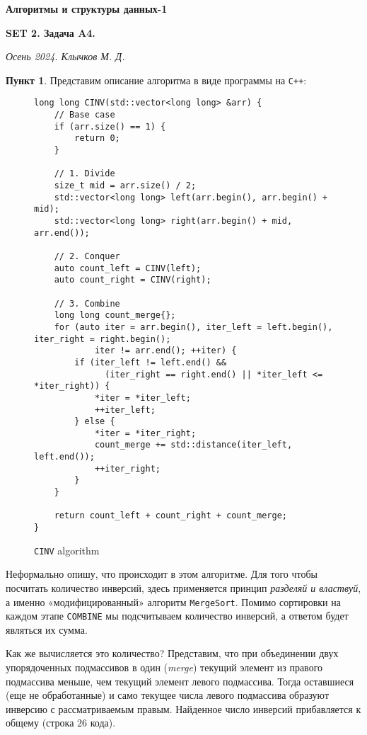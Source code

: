 \documentclass[11pt,a4paper]{scrarticle}
\author{Клычков Максим Дмитриевич}
\theoremstyle{definition}
\newtheorem{subtask}{Пункт}
\begin{document}
\centerline{\textbf{\huge Алгоритмы и структуры данных-1}}
\centerline{\textbf{SET 2. Задача A4.}}
\begin{flushright}
    \emph{Осень 2024. Клычков М. Д.}
\end{flushright}

\begin{subtask}
    Представим описание алгоритма в виде программы на \texttt{C++}:

    \begin{figure}[h]
        \centering
        \begin{verbatim}
long long CINV(std::vector<long long> &arr) {
    // Base case
    if (arr.size() == 1) {
        return 0;
    }

    // 1. Divide
    size_t mid = arr.size() / 2;
    std::vector<long long> left(arr.begin(), arr.begin() + mid);
    std::vector<long long> right(arr.begin() + mid, arr.end());

    // 2. Conquer
    auto count_left = CINV(left);
    auto count_right = CINV(right);
    
    // 3. Combine
    long long count_merge{};
    for (auto iter = arr.begin(), iter_left = left.begin(), iter_right = right.begin();
            iter != arr.end(); ++iter) {
        if (iter_left != left.end() &&
              (iter_right == right.end() || *iter_left <= *iter_right)) {
            *iter = *iter_left;
            ++iter_left;
        } else {
            *iter = *iter_right;
            count_merge += std::distance(iter_left, left.end());
            ++iter_right;                
        }
    }

    return count_left + count_right + count_merge;
}
        \end{verbatim}
        \caption{\label{fig:CINV} \texttt{CINV} algorithm}
    \end{figure}

    Неформально опишу, что происходит в этом алгоритме. Для того чтобы посчитать количество инверсий, здесь применяется принцип \emph{разделяй и властвуй}, а именно «модифицированный» алгоритм \texttt{MergeSort}. Помимо сортировки на каждом этапе \texttt{COMBINE} мы подсчитываем количество инверсий, а ответом будет являться их сумма.

    Как же вычисляется это количество? Представим, что при объединении двух упорядоченных подмассивов в один (\emph{merge}) текущий элемент из правого подмассива меньше, чем текущий элемент левого подмассива. Тогда оставшиеся (еще не обработанные) и само текущее числа левого подмассива образуют инверсию с рассматриваемым правым. Найденное число инверсий прибавляется к общему (строка $26$ кода).


\end{subtask}
\end{document}
